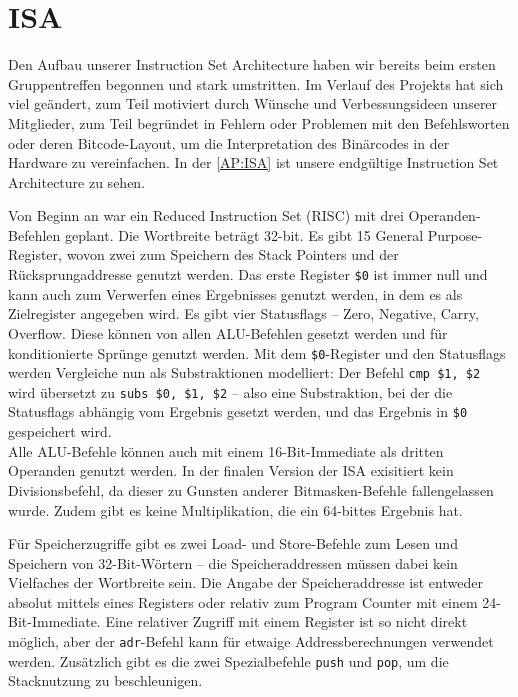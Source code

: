 \section{ISA}
Den Aufbau unserer Instruction Set Architecture haben wir bereits beim ersten Gruppentreffen begonnen und stark umstritten.
Im Verlauf des Projekts hat sich viel geändert, zum Teil motiviert durch Wünsche und Verbessungsideen unserer Mitglieder,
zum Teil begründet in Fehlern oder Problemen mit den Befehlsworten oder deren Bitcode-Layout, um die Interpretation des Binärcodes in der Hardware zu vereinfachen.
In der \autoref{AP:ISA} ist unsere endgültige Instruction Set Architecture zu sehen.

Von Beginn an war ein Reduced Instruction Set (RISC) mit drei Operanden-Befehlen geplant.
Die Wortbreite beträgt 32-bit. Es gibt 15 General Purpose-Register, wovon zwei zum Speichern des Stack Pointers und der Rücksprungaddresse genutzt werden.
Das erste Register \texttt{\$0} ist immer null und kann auch zum Verwerfen eines Ergebnisses genutzt werden, in dem es als Zielregister angegeben wird.
Es gibt vier Statusflags -- Zero, Negative, Carry, Overflow.
Diese können von allen ALU-Befehlen gesetzt werden und für konditionierte Sprünge genutzt werden.
Mit dem \texttt{\$0}-Register und den Statusflags werden Vergleiche nun als Substraktionen modelliert:
Der Befehl \texttt{cmp \$1, \$2} wird übersetzt zu \texttt{subs \$0, \$1, \$2} --
also eine Substraktion, bei der die Statusflags abhängig vom Ergebnis gesetzt werden, und das Ergebnis in \texttt{\$0} gespeichert wird. \\
Alle ALU-Befehle können auch mit einem 16-Bit-Immediate als dritten Operanden genutzt werden.
In der finalen Version der ISA exisitiert kein Divisionsbefehl, da dieser zu Gunsten anderer Bitmasken-Befehle fallengelassen wurde.
Zudem gibt es keine Multiplikation, die ein 64-bittes Ergebnis hat.

Für Speicherzugriffe gibt es zwei Load- und Store-Befehle zum Lesen und Speichern von 32-Bit-Wörtern --
die Speicheraddressen müssen dabei kein Vielfaches der Wortbreite sein.
Die Angabe der Speicheraddresse ist entweder absolut mittels eines Registers oder relativ zum Program Counter mit einem 24-Bit-Immediate.
Eine relativer Zugriff mit einem Register ist so nicht direkt möglich, aber der \texttt{adr}-Befehl kann für etwaige Addressberechnungen verwendet werden.
Zusätzlich gibt es die zwei Spezialbefehle \texttt{push} und \texttt{pop}, um die Stacknutzung zu beschleunigen.


